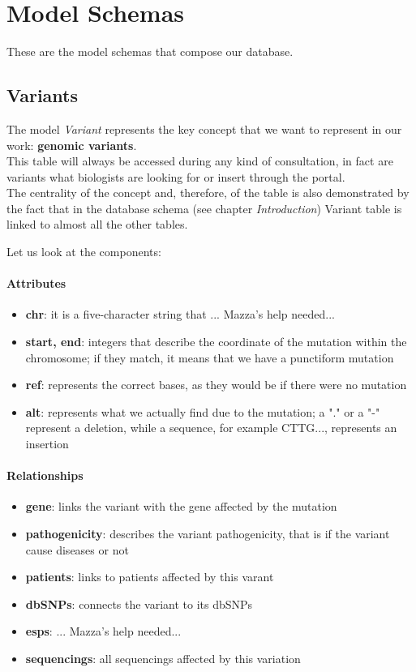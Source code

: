 \newpage

\section{Model Schemas}
These are the model schemas that compose our database.


\subsection{Variants}
The model \emph{Variant} represents the key concept that we want to represent in our work: \textbf{genomic variants}.
\\This table will always be accessed during any kind of consultation, in fact are variants what biologists are looking for or insert through the portal.
\\The centrality of the concept and, therefore, of the table is also demonstrated by the fact that in the database schema (see chapter \emph{Introduction}) Variant table is linked to almost all the other tables.


 
Let us look at the components:

\paragraph{Attributes}      
\begin{itemize}
	\item \textbf{chr}: it is a five-character string that ... {Mazza's help needed...}
 	\item \textbf{start, end}:  integers that describe the coordinate of the mutation within the chromosome; if they match, it means that we have a punctiform mutation
	\item \textbf{ref}: represents the correct bases, as they would be if there were no mutation
   	\item \textbf{alt}: represents what we actually find due to the mutation; a "." or a "-" represent a deletion, while a sequence, for example CTTG..., represents an insertion
\end{itemize}

\paragraph{Relationships}   
\begin{itemize}
	\item \textbf{gene}: links the variant with the gene affected by the mutation
	\item \textbf{pathogenicity}: describes the variant pathogenicity, that is if the variant cause diseases or not
  	\item \textbf{patients}: links to patients affected by this varant
  	\item \textbf{dbSNPs}: connects the variant to its dbSNPs
  	\item \textbf{esps}: ... {Mazza's help needed...}
  	\item \textbf{sequencings}: all sequencings affected by this variation
\end{itemize}


